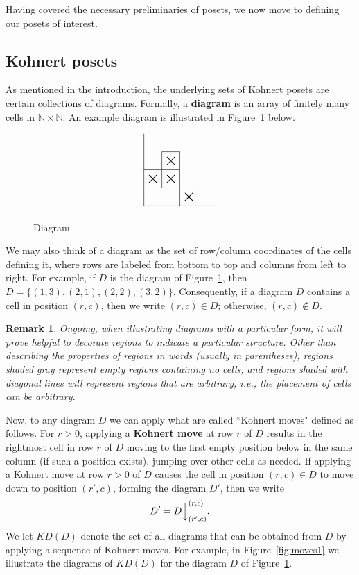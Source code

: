 \documentclass[letterpaper,10pt]{article}
\newtheorem{remark}[theorem]{Remark}
\newcommand{\ldownarrow}{\Big\downarrow}
\begin{document}
Having covered the necessary preliminaries of posets, we now move to defining our posets of interest. 



\subsection{Kohnert posets}

As mentioned in the introduction, the underlying sets of Kohnert posets are certain collections of diagrams. Formally, a \textbf{diagram} is an array of finitely many cells in $\mathbb{N}\times\mathbb{N}$. An example diagram is illustrated in Figure~\ref{fig:diagram} below.

\begin{figure}[H]
    \centering
    $$\begin{tikzpicture}[scale=0.65]
  \node at (1.5, 2.5) {$\bigtimes$};
  \node at (0.5, 1.5) {$\bigtimes$};
  \node at (1.5, 1.5) {$\bigtimes$};
  \node at (2.5, 0.5) {$\bigtimes$};
  \draw (0,4)--(0,0)--(4,0);
  \draw (1,3)--(2,3)--(2,2)--(1,2)--(1,3);
  \draw (2,2)--(2,1)--(1,1)--(1,2)--(0,2);
  \draw (0,1)--(1,1);
  \draw (2,0)--(2,1)--(3,1)--(3,0);
\end{tikzpicture}$$
    \caption{Diagram}
    \label{fig:diagram}
\end{figure}

\noindent
We may also think of a diagram as the set of row/column coordinates of the cells defining it, where rows are labeled from bottom to top and columns from left to right. For example, if $D$ is the diagram of Figure~\ref{fig:diagram}, then $D=\{(1,3),(2,1),(2,2),(3,2)\}$. Consequently, if a diagram $D$ contains a cell in position $(r,c)$, then we write $(r,c)\in D$; otherwise, $(r,c)\notin D$.

\begin{remark}
    Ongoing, when illustrating diagrams with a particular form, it will prove helpful to decorate regions to indicate a particular structure. Other than describing the properties of regions in words \textup(usually in parentheses\textup), regions shaded gray represent empty regions containing no cells, and regions shaded with diagonal lines will represent regions that are arbitrary, i.e., the placement of cells can be arbitrary.
\end{remark}


Now, to any diagram $D$ we can apply what are called ``Kohnert moves" defined as follows. For $r>0$, applying a \textbf{Kohnert move} at row $r$ of $D$ results in the rightmost cell in row $r$ of $D$ moving to the first empty position below in the same column (if such a position exists), jumping over other cells as needed. If applying a Kohnert move at row $r>0$ of $D$ causes the cell in position $(r,c)\in D$ to move down to position $(r',c)$, forming the diagram $D'$, then we write $$D'=D\ldownarrow^{(r,c)}_{(r',c)}.$$ We let $KD(D)$ denote the set of all diagrams that can be obtained from $D$ by applying a sequence of Kohnert moves. For example, in Figure~\ref{fig:moves1} we illustrate the diagrams of $KD(D)$ for the diagram $D$ of Figure~\ref{fig:diagram}.
\end{document}
